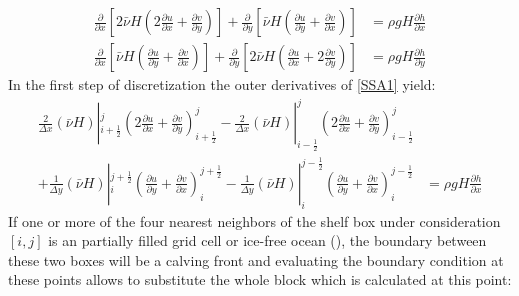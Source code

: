 \documentclass[a4paper,10pt]{article}
\begin{document}
\begin{align}
\frac{\partial}{\partial x}\left[ 2\bar\nu H\left( 2\frac{\partial u}{\partial x} + \frac{\partial v}{\partial y} \right)\right] + \frac{\partial }{\partial y}\left[\bar\nu H\left(\frac{\partial u}{\partial y}+\frac{\partial v}{\partial x}  \right) \right] &= \rho gH \frac{\partial h}{\partial x} \label{SSA1} \\
\frac{\partial}{\partial x}\left[ \bar\nu H\left( \frac{\partial u}{\partial y} + \frac{\partial v}{\partial x} \right)\right] + \frac{\partial }{\partial y}\left[2\bar\nu H\left(\frac{\partial u}{\partial x}+2\frac{\partial v}{\partial y}  \right) \right] &= \rho gH \frac{\partial h}{\partial y} \label{SSA2}
\end{align}
\noindent In the first step of discretization the outer derivatives of \eqref{SSA1} yield:
\begin{align}
\frac{2}{\Delta x}(\bar{\nu} H)|_{i+\frac{1}{2}}^j\left( 2\frac{\partial u}{\partial x} + \frac{\partial v}{\partial y} \right)_{i+\frac{1}{2}}^j
- \frac{2}{\Delta x}(\bar{\nu} H)|_{i-\frac{1}{2}}^j\left( 2\frac{\partial u}{\partial x} + \frac{\partial v}{\partial y} \right)_{i-\frac{1}{2}}^j \nonumber \\
+ \frac{1}{\Delta y}(\bar{\nu} H)|_i^{j+\frac{1}{2}}\left(\frac{\partial u}{\partial y}+\frac{\partial v}{\partial x}\right)_i^{j+\frac{1}{2}} 
- \frac{1}{\Delta y}(\bar{\nu} H)|_i^{j-\frac{1}{2}}\left(\frac{\partial u}{\partial y}+\frac{\partial v}{\partial x}\right)_i^{j-\frac{1}{2}} 
&= \rho gH \frac{\partial h}{\partial x} \label{SSA1_dis1} 
\end{align}
If one or more of the four nearest neighbors of the shelf box under consideration $[i,j]$ is an partially filled grid cell or ice-free ocean (\cite{Albrecht_Martin10}), the boundary between these two boxes will be a calving front and evaluating the boundary condition at these points allows to substitute the whole block which is calculated at this point:
\end{document}
